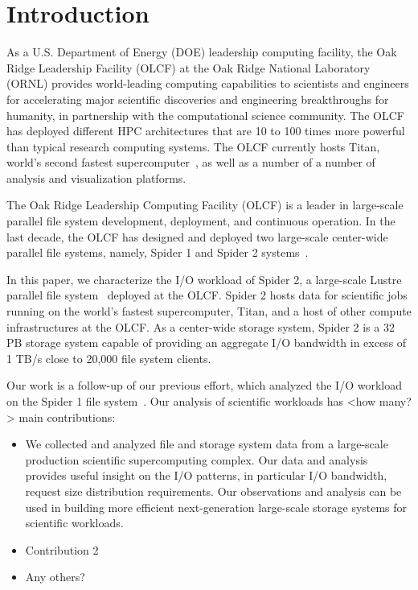 \section{Introduction}
\label{sec:intro}

As a U.S. Department of Energy (DOE) leadership computing facility, the Oak
Ridge Leadership Facility (OLCF) at the Oak Ridge National Laboratory (ORNL)
provides world-leading computing capabilities to scientists and engineers for
accelerating major scientific discoveries and engineering breakthroughs for
humanity, in partnership with the computational science community. The OLCF has
deployed different HPC architectures that are 10 to 100 times more powerful
than typical research computing systems. The OLCF currently hosts Titan,
world's second fastest supercomputer~\cite{titan}, as well as a number of a
number of analysis and visualization platforms.


The Oak Ridge Leadership Computing Facility (OLCF) is a leader in large-scale
parallel file system development, deployment, and continuous operation. In the
last decade, the OLCF has designed and deployed two large-scale center-wide
parallel file systems, namely, Spider 1 and Spider 2 systems~\cite{spider1,
spider2}. 

In this paper, we characterize the I/O workload of Spider 2, a large-scale
Lustre parallel file system~\cite{spider2} deployed at the OLCF. Spider 2 hosts
data for scientific jobs running on the world's fastest supercomputer, Titan,
and a host of other compute infrastructures at the OLCF. As a
center-wide storage system, Spider 2 is a 32 PB storage system capable of
providing an aggregate I/O bandwidth in excess of 1 TB/s close to 20,000
file system clients. 

Our work is a follow-up of our previous effort, which analyzed the I/O workload
on the Spider 1 file system~\cite{spider1-workload}.  Our analysis of
scientific workloads has <how many?> main contributions: 

\begin{itemize}


\item We collected and analyzed file and storage system data from a large-scale
production scientific supercomputing complex. Our data and analysis provides
useful insight on the I/O patterns, in particular I/O bandwidth, request size
distribution requirements. Our observations and analysis can be used in
building more efficient next-generation large-scale storage systems for
scientific workloads.  

\item Contribution 2

\item Any others? 

\end{itemize}
